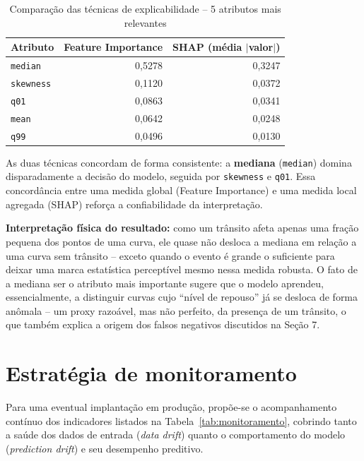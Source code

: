 \documentclass[12pt,a4paper]{article}
\begin{document}
\begin{table}[H]
\centering
\caption{Comparação das técnicas de explicabilidade -- 5 atributos mais relevantes}
\begin{tabular}{lrr}
\toprule
\textbf{Atributo} & \textbf{Feature Importance} & \textbf{SHAP (média $|$valor$|$)} \\
\midrule
\texttt{median} & 0{,}5278 & 0{,}3247 \\
\texttt{skewness} & 0{,}1120 & 0{,}0372 \\
\texttt{q01} & 0{,}0863 & 0{,}0341 \\
\texttt{mean} & 0{,}0642 & 0{,}0248 \\
\texttt{q99} & 0{,}0496 & 0{,}0130 \\
\bottomrule
\end{tabular}
\end{table}

As duas técnicas concordam de forma consistente: a \textbf{mediana} (\texttt{median}) domina disparadamente a decisão do modelo, seguida por \texttt{skewness} e \texttt{q01}. Essa concordância entre uma medida global (Feature Importance) e uma medida local agregada (SHAP) reforça a confiabilidade da interpretação.

\textbf{Interpretação física do resultado:} como um trânsito afeta apenas uma fração pequena dos pontos de uma curva, ele quase não desloca a mediana em relação a uma curva sem trânsito -- exceto quando o evento é grande o suficiente para deixar uma marca estatística perceptível mesmo nessa medida robusta. O fato de a mediana ser o atributo mais importante sugere que o modelo aprendeu, essencialmente, a distinguir curvas cujo ``nível de repouso'' já se desloca de forma anômala -- um proxy razoável, mas não perfeito, da presença de um trânsito, o que também explica a origem dos falsos negativos discutidos na Seção 7.


\section{Estratégia de monitoramento}

Para uma eventual implantação em produção, propõe-se o acompanhamento contínuo dos indicadores listados na Tabela~\ref{tab:monitoramento}, cobrindo tanto a saúde dos dados de entrada (\textit{data drift}) quanto o comportamento do modelo (\textit{prediction drift}) e seu desempenho preditivo.
\end{document}
